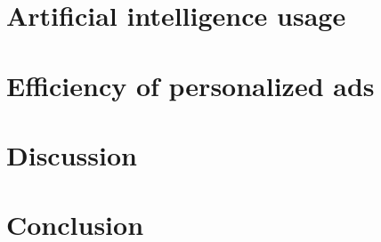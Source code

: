 \documentclass[10pt,twoside,english,a4paper]{article}
\begin{document}
\section{Artificial intelligence usage}


\section{Efficiency of personalized ads}

\section{Discussion}

\section{Conclusion}






\end{document}
